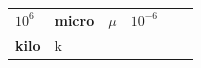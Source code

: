 {\begin{center}
\begin{xtabular*}{\mytablewidth}[t]{|p{10\mystarwidth}|p{10\mystarwidth}|p{10\mystarwidth}|p{10\mystarwidth}|p{10\mystarwidth}|p{10\mystarwidth}|}
        
                \begin{math}{10}^{6}\end{math}
               &
    
    
        
                \textbf{micro}
               &
    
    
        
                \begin{math}\mu \end{math}
               &
    
    
        
                \begin{math}{10}^{-6}\end{math}
     \tabularnewline{}
    
    
        
                \textbf{kilo}
               &
    
    
        k &
    
    
        

\end{xtabular*}
\end{center}}
